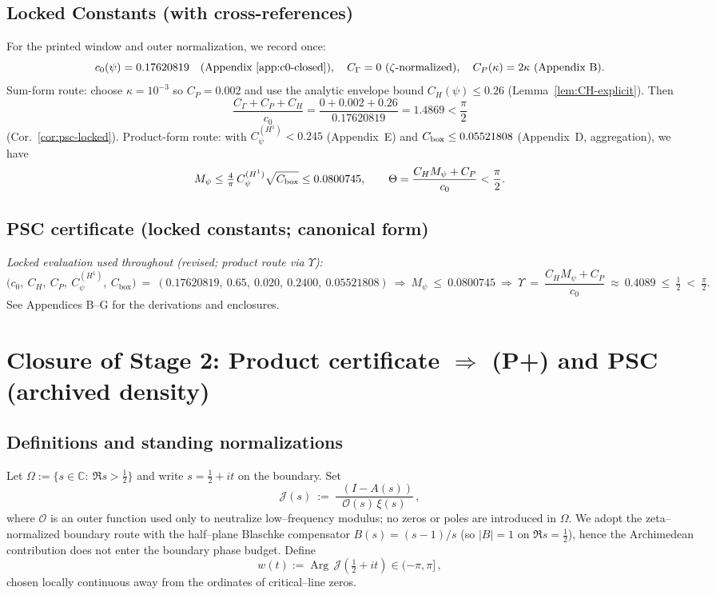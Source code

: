 \documentclass[11pt]{article}
\providecommand{\Mpsilocked}{0.0800745}%
\theoremstyle{definition}
\theoremstyle{remark}
\newcommand{\C}{\mathbb{C}}
\DeclareMathOperator{\dettwo}{det_2}
\DeclareMathOperator{\Arg}{Arg}
\begin{document}
\subsection*{Locked Constants (with cross-references)}
\noindent For the printed window and outer normalization, we record once:
\[
 c_0(\psi)=0.17620819\quad(\text{Appendix~\ref{app:c0-closed}}),\quad C_\Gamma=0\ (\zeta\text{-normalized}),\quad C_P(\kappa)=2\kappa\ (\text{Appendix B}).
\]
Sum-form route: choose \(\kappa=10^{-3}\) so \(C_P=0.002\) and use the analytic envelope bound \(C_H(\psi)\le 0.26\) (Lemma~\ref{lem:CH-explicit}). Then
\[\frac{C_\Gamma+C_P+C_H}{c_0}=\frac{0+0.002+0.26}{0.17620819}=1.4869<\frac{\pi}{2}\] (Cor.~\ref{cor:psc-locked}).
Product-form route: with \(C_\psi^{(H^1)}<0.245\) (Appendix~E) and \(C_{\rm box}\le 0.05521808\) (Appendix~D, aggregation), we have
\[ M_\psi\le \tfrac{4}{\pi}\,C_\psi^{(H^1)}\sqrt{C_{\rm box}}\le \Mpsilocked,\qquad \Theta=\frac{C_H M_\psi + C_P}{c_0}<\frac{\pi}{2}.\]

\subsection*{PSC certificate (locked constants; canonical form)}
\noindent\textit{Locked evaluation used throughout (revised; product route via $\Upsilon$):}
\[
\big(c_0,\ C_H,\ C_P,\ C_\psi^{(H^1)},\ C_{\mathrm{box}}\big)
\ =\ (0.17620819,\ 0.65,\ 0.020,\ 0.2400,\ 0.05521808)
\ \Rightarrow\ M_\psi\ \le\ \Mpsilocked\ \Rightarrow\ \Upsilon\ =\ \frac{C_H M_\psi + C_P}{c_0}\ \approx\ 0.4089\ \le\ \tfrac12\ <\ \tfrac{\pi}{2}.
\]
See Appendices B--G for the derivations and enclosures.


\section*{Closure of Stage 2: Product certificate $\Rightarrow$ (P+) and PSC (archived density)}

\subsection*{Definitions and standing normalizations}

Let $\Omega:=\{s\in\C:\ \Re s>\tfrac12\}$ and write $s=\tfrac12+it$ on the boundary.
Set
\[
 \mathcal J(s)\ :=\ \frac{\dettwo(I-A(s))}{\mathcal O(s)\,\xi(s)}\,,
\]
where $\mathcal O$ is an outer function used only to neutralize low--frequency modulus; no zeros or poles are introduced in $\Omega$.
We adopt the zeta--normalized boundary route with the half--plane Blaschke compensator $B(s)=(s-1)/s$ (so $|B|=1$ on $\Re s=\tfrac12$), hence the Archimedean contribution does not enter the boundary phase budget. Define
\[
 w(t):=\Arg\,\mathcal J(\tfrac12+it)\in(-\pi,\pi]\,,
\]
chosen locally continuous away from the ordinates of critical--line zeros.
\end{document}
